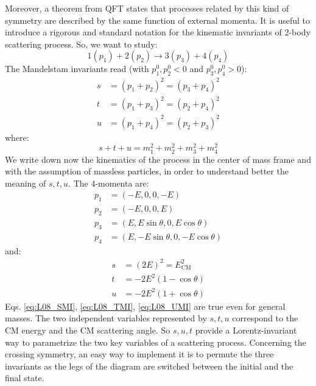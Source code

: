 \documentclass[../../main/main.tex]{subfiles}
\begin{document}
Moreover, a theorem from QFT states that processes related by this kind of symmetry are described by the same function of external momenta. It is useful to introduce a rigorous and standard notation for the kinematic invariants of 2-body scattering process. So, we want to study:
\begin{equation}
	1(p_1) + 2(p_2)
	\longrightarrow
	3(p_3) + 4(p_4)
	\label{eq:}
\end{equation}
The Mandelstam invariants read (with \( p^0_1, p^0_2 < 0 \) and \( p^0_3, p^0_4 > 0 \)):
\begin{subequations}
	\begin{align}
		s &= (p_1 + p_2)^2 = (p_3 + p_4)^2	\\
		t &= (p_1 + p_3)^2 = (p_2 + p_4)^2	\\
		u &= (p_1 + p_4)^2 = (p_2 + p_3)^2
	\end{align}
	\label{eq:L08_MI}
\end{subequations}
where:
\begin{equation}
	s + t + u
	=
	m_1^2 + m_2^2 + m_3^2 + m_4^2
	\label{eq:L08_MIC}
\end{equation}
We write down now the kinematics of the process in the center of mass frame and with the assumption of massless particles, in order to understand better the meaning of \( s,t,u \). The 4-momenta are:
\begin{subequations}
	\begin{align}
		p_1 &= (-E, 0, 0, -E)	\\
		p_2 &= (-E, 0, 0,  E)	\\
		p_3 &= (E, E\sin \theta, 0, E\cos \theta)	\\
		p_4 &= (E, -E\sin \theta, 0, -E\cos \theta)
	\end{align}
	\label{eq:L08_4M}
\end{subequations}
and:
\begin{align}
	s &= (2E)^2 = E^2_\mathrm{CM}	\label{eq:L08_SMI}	\\
	t &= -2E^2 (1 - \cos \theta)	\label{eq:L08_TMI}	\\
	u &= -2E^2 (1 + \cos \theta)	\label{eq:L08_UMI}
\end{align}
Eqs. \ref{eq:L08_SMI}, \ref{eq:L08_TMI}, \ref{eq:L08_UMI} are true even for general masses. The two independent variables represented by \( s,t,u \) correspond to the CM energy and the CM scattering angle. So \( s,u,t \) provide a Lorentz-invariant way to parametrize the two key variables of a scattering process. Concerning the crossing symmetry, an easy way to implement it is to permute the three invariants as the legs of the diagram are switched between the initial and the final state.
\end{document}
